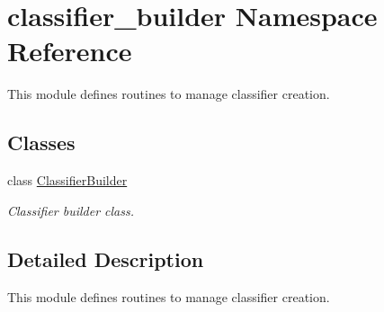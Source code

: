 \hypertarget{namespaceclassifier__builder}{}\section{classifier\+\_\+builder Namespace Reference}
\label{namespaceclassifier__builder}


This module defines routines to manage classifier creation.  


\subsection*{Classes}
\begin{DoxyCompactItemize}
\item 
class \mbox{\hyperlink{classclassifier__builder_1_1_classifier_builder}{Classifier\+Builder}}
\begin{DoxyCompactList}\small\item\em Classifier builder class. \end{DoxyCompactList}\end{DoxyCompactItemize}


\subsection{Detailed Description}
This module defines routines to manage classifier creation. 

